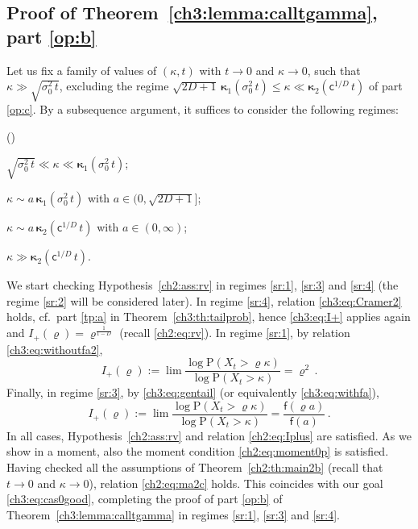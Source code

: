 \documentclass[a4paper,reqno,11pt]{amsart}
\numberwithin{equation}{section}
\newcommand{\PEfont}{\mathrm}
\renewcommand{\P}{\ensuremath{\PEfont P}}
\renewcommand{\rho}{\varrho}
\newcommand\sfc{\mathsf{c}}
\newcommand\sff{\mathsf{f}}
\newenvironment{ienumerate}{%
\renewcommand{\theenumi}{\roman{enumi}}%
\renewcommand{\labelenumi}{{\rm(\theenumi)}}%
\begin{list}{\labelenumi}
	{%
	\setlength{\itemsep}{0.4em}%
	\setlength{\topsep}{0.5em}%
	\setlength\leftmargin{2.45em}%
	\setlength\labelwidth{2.05em}%
	\setlength{\labelsep}{0.4em}%
	\usecounter{enumi}%
	}%
	}%
{\end{list}
}
\newcommand\bkappa{\boldsymbol{\kappa}}
\newcommand\blue{\color{blue}}
\begin{document}
\subsection{Proof of  Theorem~\ref{ch3:lemma:calltgamma}, part \eqref{op:b}}

Let us fix a family of values of $(\kappa,t)$ with $t \to 0$ and $\kappa \to 0$,
such that $\kappa \gg \sqrt{\sigma_0^2 \, t}$, excluding the regime
$\sqrt{2D+1} \, \bkappa_1( \sigma_0^2 \, t)  \leq \kappa 
\ll \bkappa_2( \sfc^{1/D} \, t)$
of part \eqref{op:c}. By a subsequence argument, it suffices to consider
the following regimes:
\begin{ienumerate}
\item\label{sr:1} $\sqrt{\sigma_0^2 \, t} \ll \kappa \ll \bkappa_1( \sigma_0^2 \, t)$;

\item\label{sr:2} $\kappa \sim a \, \bkappa_1( \sigma_0^2 \, t)$ 
with $a \in (0, \sqrt{2D+1}]$;

\item\label{sr:3} $\kappa \sim a \, \bkappa_2( \sfc^{1/D} \,  t)$ with $a \in (0, \infty)$;

\item\label{sr:4} $\kappa \gg \bkappa_2( \sfc^{1/D} \,  t)$.
\end{ienumerate}

We start checking Hypothesis~\ref{ch2:ass:rv}
in regimes \eqref{sr:1}, \eqref{sr:3} and \eqref{sr:4}
(the regime \eqref{sr:2} will be considered later).
In regime \eqref{sr:4}, relation \eqref{ch3:eq:Cramer2}
holds, cf.\ part \eqref{tp:a} in Theorem~\ref{ch3:th:tailprob}, hence
\eqref{ch3:eq:I+} applies again and 
$I_+(\rho) = \rho^{\frac{1}{1-D}}$ (recall \eqref{ch2:eq:rv}).
In regime \eqref{sr:1}, by relation \eqref{ch3:eq:withoutfa2},
\begin{equation} \label{ch3:eq:I+2}
	I_+(\rho) := \lim \frac{\log \P(X_t > \rho\kappa)}{\log \P(X_t > \kappa)}
	= \rho^2 \,.
\end{equation}
Finally, in regime \eqref{sr:3}, by \eqref{ch3:eq:gentail} (or equivalently \eqref{ch3:eq:withfa}),
\begin{equation} \label{ch3:eq:I+3}
	I_+(\rho) := \lim \frac{\log \P(X_t > \rho\kappa)}{\log \P(X_t > \kappa)}
	= \frac{\sff(\rho a)}{\sff(a)} \,.
\end{equation}
In all cases, Hypothesis~\ref{ch2:ass:rv} and relation \eqref{ch2:eq:Iplus} are satisfied.
As we show in a moment, also the moment condition \eqref{ch2:eq:moment0p} is satisfied.
Having checked all the assumptions of Theorem~\ref{ch2:th:main2b}
(recall that $t\to 0$ and $\kappa \to 0$), relation \eqref{ch2:eq:ma2c} holds.
This coincides with our goal \eqref{ch3:eq:cas0good}, completing the proof of 
part \eqref{op:b} of Theorem~\ref{ch3:lemma:calltgamma} 
in regimes \eqref{sr:1}, \eqref{sr:3} and \eqref{sr:4}.
\end{document}
